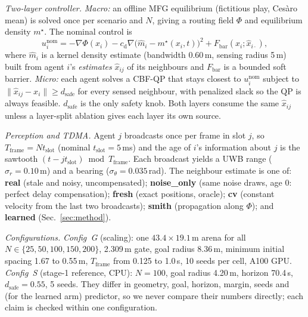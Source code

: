 \documentclass[letterpaper,10pt,journal,twoside]{IEEEtran}
\newcommand{\Tf}{T_{\mathrm{frame}}}
\newcommand{\tslot}{t_{\mathrm{slot}}}
\newcommand{\dsafe}{d_{\mathrm{safe}}}
\begin{document}
\emph{Two-layer controller.} \emph{Macro:} an offline MFG equilibrium (fictitious play, Ces\`aro mean) is solved
once per scenario and $N$, giving a routing field $\Phi$ and equilibrium density $m^\star$. The nominal control is
\begin{equation}
u_i^{\mathrm{nom}} = -\nabla\Phi(x_i) - c_{\mathrm{d}}\nabla\big(\hat m_i - m^\star(x_i,t)\big)^2 + F_{\mathrm{bar}}(x_i;\hat x_{i\cdot}),
\end{equation}
where $\hat m_i$ is a kernel density estimate (bandwidth 0.60\,m, sensing radius 5\,m) built from agent $i$'s
\emph{estimates} $\hat x_{ij}$ of its neighbours and $F_{\mathrm{bar}}$ is a bounded soft barrier.
\emph{Micro:} each agent solves a CBF-QP that stays closest to $u_i^{\mathrm{nom}}$ subject to
$\|\hat x_{ij}-x_i\|\ge\dsafe$ for every sensed neighbour, with penalized slack so the QP is always feasible.
$\dsafe$ is the only safety knob. Both layers consume the same $\hat x_{ij}$ unless a layer-split ablation gives
each layer its own source.

\emph{Perception and TDMA.} Agent $j$ broadcasts once per frame in slot $j$, so $\Tf{=}N\tslot$ (nominal
$\tslot{=}5$\,ms) and the age of $i$'s information about $j$ is the sawtooth $(t-j\tslot)\bmod\Tf$. Each
broadcast yields a UWB range ($\sigma_r{=}0.10$\,m) and a bearing ($\sigma_\theta{=}0.035$\,rad).
The neighbour estimate is one of: \textbf{real} (stale and noisy, uncompensated); \textbf{noise\_only} (same noise
draws, age 0: perfect delay compensation); \textbf{fresh} (exact positions, oracle); \textbf{cv}
(constant velocity from the last two broadcasts); \textbf{smith} (propagation along $\Phi$); and \textbf{learned}
(Sec.~\ref{sec:method}).

\emph{Configurations.} \emph{Config~G} (scaling): one $43.4{\times}19.1$\,m arena for all
$N\in\{25,50,100,150,200\}$, 2.309\,m gate, goal radius 8.36\,m, minimum initial spacing 1.67 to 0.55\,m, $\Tf$
from 0.125 to 1.0\,s, 10 seeds per cell, A100 GPU. \emph{Config~S} (stage-1 reference, CPU): $N{=}100$, goal
radius 4.20\,m, horizon 70.4\,s, $\dsafe{=}0.55$, 5 seeds. They differ in geometry, goal, horizon, margin, seeds
and (for the learned arm) predictor, so we never compare their numbers directly; each claim is checked within
one configuration.
\end{document}
